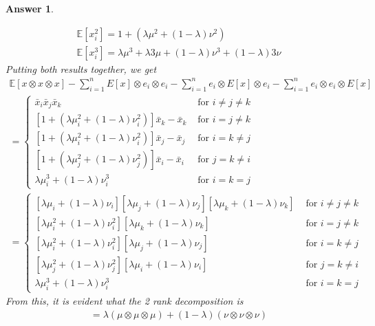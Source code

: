 \documentclass[12pt]{article}
\theoremstyle{colon}
\newtheorem*{answer}{Answer}
\begin{document}
\begin{answer}
\begin{enumerate}[label=\arabic*)]
      \begin{gather*}
        \mathbb{E}[x_i^2] = 1 + (\lambda \mu^2 + (1-\lambda) \nu^2) \\
        \mathbb{E}[x_i^3] = \lambda \mu^3 + \lambda 3 \mu + (1-\lambda) \nu^3 + (1-\lambda) 3 \nu
      \end{gather*}
      Putting both results together, we get
      \begin{gather*}
        \mathbb{E}[ x \otimes x \otimes x ] - \sum_{i=1}^n E[x] \otimes e_i \otimes e_i - \sum_{i=1}^n e_i \otimes E[x] \otimes e_i - \sum_{i=1}^n  e_i \otimes e_i \otimes E[x] \\
        = \begin{cases}
          \bar{x}_i \bar{x}_j \bar{x}_k & \text{ for } i \neq j \neq k \\
          [1 + (\lambda \mu_i^2 + (1-\lambda) \nu_i^2)] \bar{x}_k - \bar{x}_k & \text{ for } i = j \neq k \\
          [1 + (\lambda \mu_i^2 + (1-\lambda) \nu_i^2)] \bar{x}_j - \bar{x}_j & \text{ for } i = k \neq j \\
          [1 + (\lambda \mu_j^2 + (1-\lambda) \nu_j^2)] \bar{x}_i - \bar{x}_i & \text{ for } j = k \neq i \\
          \lambda \mu_i^3 + (1-\lambda) \nu_i^3 & \text{ for } i = k = j
        \end{cases} \\
        = \begin{cases}
          [\lambda \mu_i + (1-\lambda) \nu_i] [\lambda \mu_j + (1-\lambda) \nu_j] [\lambda \mu_k + (1-\lambda) \nu_k] & \text{ for } i \neq j \neq k \\
          [\lambda \mu_i^2 + (1-\lambda) \nu_i^2] [\lambda \mu_k + (1-\lambda) \nu_k] & \text{ for } i = j \neq k \\
          [\lambda \mu_i^2 + (1-\lambda) \nu_i^2] [\lambda \mu_j + (1-\lambda) \nu_j] & \text{ for } i = k \neq j \\
          [\lambda \mu_j^2 + (1-\lambda) \nu_j^2] [\lambda \mu_i + (1-\lambda) \nu_i] & \text{ for } j = k \neq i \\
          \lambda \mu_i^3 + (1-\lambda) \nu_i^3 & \text{ for } i = k = j
        \end{cases}
      \end{gather*}
      From this, it is evident what the 2 rank decomposition is
      \begin{gather*}
        = \lambda (\mu \otimes \mu \otimes \mu) + (1-\lambda) (\nu \otimes \nu \otimes \nu)
      \end{gather*}


\end{enumerate}
\end{answer}
\end{document}
